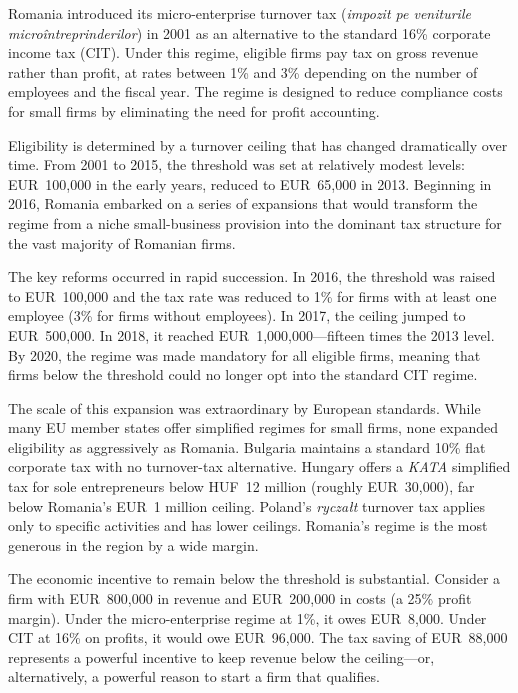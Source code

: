 \documentclass[12pt]{article}
\begin{document}
Romania introduced its micro-enterprise turnover tax (\textit{impozit pe veniturile microîntreprinderilor}) in 2001 as an alternative to the standard 16\% corporate income tax (CIT). Under this regime, eligible firms pay tax on gross revenue rather than profit, at rates between 1\% and 3\% depending on the number of employees and the fiscal year. The regime is designed to reduce compliance costs for small firms by eliminating the need for profit accounting.

Eligibility is determined by a turnover ceiling that has changed dramatically over time. From 2001 to 2015, the threshold was set at relatively modest levels: EUR~100,000 in the early years, reduced to EUR~65,000 in 2013. Beginning in 2016, Romania embarked on a series of expansions that would transform the regime from a niche small-business provision into the dominant tax structure for the vast majority of Romanian firms.

The key reforms occurred in rapid succession. In 2016, the threshold was raised to EUR~100,000 and the tax rate was reduced to 1\% for firms with at least one employee (3\% for firms without employees). In 2017, the ceiling jumped to EUR~500,000. In 2018, it reached EUR~1,000,000---fifteen times the 2013 level. By 2020, the regime was made mandatory for all eligible firms, meaning that firms below the threshold could no longer opt into the standard CIT regime.

The scale of this expansion was extraordinary by European standards. While many EU member states offer simplified regimes for small firms, none expanded eligibility as aggressively as Romania. Bulgaria maintains a standard 10\% flat corporate tax with no turnover-tax alternative. Hungary offers a \textit{KATA} simplified tax for sole entrepreneurs below HUF~12 million (roughly EUR~30,000), far below Romania's EUR~1 million ceiling. Poland's \textit{ryczałt} turnover tax applies only to specific activities and has lower ceilings. Romania's regime is the most generous in the region by a wide margin.

The economic incentive to remain below the threshold is substantial. Consider a firm with EUR~800,000 in revenue and EUR~200,000 in costs (a 25\% profit margin). Under the micro-enterprise regime at 1\%, it owes EUR~8,000. Under CIT at 16\% on profits, it would owe EUR~96,000. The tax saving of EUR~88,000 represents a powerful incentive to keep revenue below the ceiling---or, alternatively, a powerful reason to start a firm that qualifies.
\end{document}
